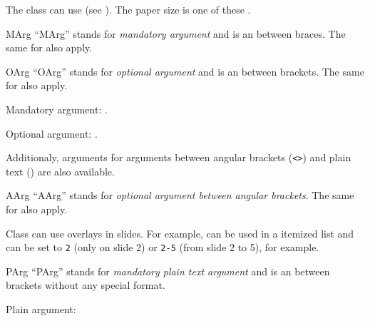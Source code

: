 \documentclass[11pt, outputdir = ./out]{article}
\begin{document}
\begin{example}{}
    The  class can use  (see ). The paper size is one of these .
\end{example}

\begin{Macrodef}{MArg}{}{}
    ``MArg'' stands for \textit{mandatory argument} and is an  between braces. The same  for  also apply.
\end{Macrodef}

\begin{Macrodef}{OArg}{}{}
    ``OArg'' stands for \textit{optional argument} and is an  between brackets. The same  for  also apply.
\end{Macrodef}

\begin{example}{}
    Mandatory argument: .\par
    Optional argument: .
\end{example}

Additionaly, arguments for arguments between angular brackets (\texttt{<>}) and plain text () are also available.

\begin{Macrodef}{AArg}{}{}
    ``AArg'' stands for \textit{optional argument between angular brackets}. The same  for  also apply.
\end{Macrodef}

\begin{example}{}
    Class  can use overlays in slides. For example,  can be used in a itemized list and  can be set to \texttt{2} (only on slide 2) or \texttt{2-5} (from slide 2 to 5), for example.
\end{example}

\begin{Macrodef}{PArg}{}{}
    ``PArg'' stands for \textit{mandatory plain text argument} and is an  between brackets without any special format.
\end{Macrodef}

\begin{example}{}
    Plain argument: 
\end{example}
\end{document}
